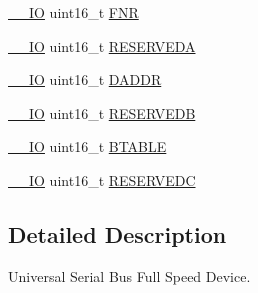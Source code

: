 \begin{DoxyCompactItemize}
\item 
\hyperlink{core__sc300_8h_aec43007d9998a0a0e01faede4133d6be}{\-\_\-\-\_\-\-I\-O} uint16\-\_\-t \hyperlink{struct_u_s_b___type_def_aea51e93434766c9507d6a3911a0e7e91}{F\-N\-R}
\item 
\hyperlink{core__sc300_8h_aec43007d9998a0a0e01faede4133d6be}{\-\_\-\-\_\-\-I\-O} uint16\-\_\-t \hyperlink{struct_u_s_b___type_def_ac729616a1792efd2891f8d938692071e}{R\-E\-S\-E\-R\-V\-E\-D\-A}
\item 
\hyperlink{core__sc300_8h_aec43007d9998a0a0e01faede4133d6be}{\-\_\-\-\_\-\-I\-O} uint16\-\_\-t \hyperlink{struct_u_s_b___type_def_a3a8069bbd10ce243a750f5e18346ce2e}{D\-A\-D\-D\-R}
\item 
\hyperlink{core__sc300_8h_aec43007d9998a0a0e01faede4133d6be}{\-\_\-\-\_\-\-I\-O} uint16\-\_\-t \hyperlink{struct_u_s_b___type_def_a29a2b0fc48938cd5bc79f892546fadf3}{R\-E\-S\-E\-R\-V\-E\-D\-B}
\item 
\hyperlink{core__sc300_8h_aec43007d9998a0a0e01faede4133d6be}{\-\_\-\-\_\-\-I\-O} uint16\-\_\-t \hyperlink{struct_u_s_b___type_def_a595086949677f98d2cc1900af3f08c1c}{B\-T\-A\-B\-L\-E}
\item 
\hyperlink{core__sc300_8h_aec43007d9998a0a0e01faede4133d6be}{\-\_\-\-\_\-\-I\-O} uint16\-\_\-t \hyperlink{struct_u_s_b___type_def_a88f013eaee07f62c2138879084332de6}{R\-E\-S\-E\-R\-V\-E\-D\-C}
\end{DoxyCompactItemize}


\subsection{Detailed Description}
Universal Serial Bus Full Speed Device. 

